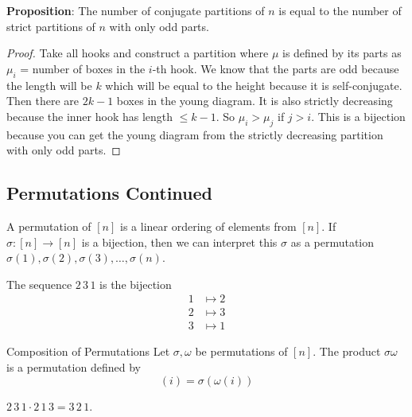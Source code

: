 \documentclass{report}
\begin{document}
\textbf{Proposition}: The number of conjugate partitions of $n$ is equal to the number of strict partitions of $n$ with only odd parts.
    \begin{proof}
        Take all hooks and construct a partition where $\mu$ is defined by its parts as $\mu_{i}$ = number of boxes in the $i$-th hook. We know that the parts are odd because the length will be $k$ which will be equal to the height because it is self-conjugate. Then there are $2k - 1$ boxes in the young diagram. It is also strictly decreasing because the inner hook has length $ \leq k - 1$. So $\mu_{i} >  \mu_{j}$ if $j > i$. This is a bijection because you can get the young diagram from the strictly decreasing partition with only odd parts.
    \end{proof}

\begin{topic}
    \section{Permutations Continued}
\end{topic}

A permutation of $[n]$ is a linear ordering of elements from $[n]$. If $\sigma: [n] \rightarrow [n]$ is a bijection, then we can interpret this $\sigma$ as a permutation $\sigma(1), \sigma(2), \sigma(3), \ldots , \sigma(n)$.

\begin{examples}
    \begin{example}
        The sequence $2 \, 3 \, 1$ is the bijection
            \begin{align*}
                1 &\mapsto  2 \\
                2 &\mapsto  3 \\
                3 &\mapsto  1   
            \end{align*}
    \end{example}
\end{examples}

\begin{definition}{Composition of Permutations}
    Let $\sigma, \omega$ be permutations of $[n]$. The product $\sigma\omega$ is a permutation defined by
        \begin{equation*}
            [\sigma\omega](i) = \sigma(\omega(i))
        \end{equation*}
\end{definition}

\begin{examples}
    \begin{example}
        $2 \, 3 \,  1 \cdot 2 \,  1 \,  3 = 3 \, 2 \, 1$. 
    \end{example}
\end{examples}
\end{document}
